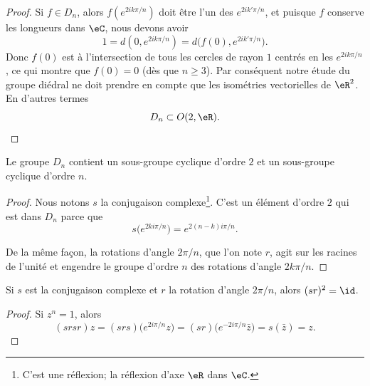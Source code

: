 \begin{proof}
	Si \( f\in D_n\), alors \( f( e^{2ik\pi/n}) \) doit être l'un des \(  e^{2ik'\pi/n}\), et puisque \( f\) conserve les longueurs dans \( \eC\), nous devons avoir
	\begin{equation}
		1=d(0, e^{2ik\pi/n})=d\big( f(0), e^{2ik'\pi/n} \big).
	\end{equation}
	Donc \( f(0)\) est à l'intersection de tous les cercles de rayon \( 1\) centrés en les \(  e^{2ik\pi/n}\), ce qui montre que \( f(0)=0\) (dès que \( n\geq 3\)). Par conséquent notre étude du groupe diédral ne doit prendre en compte que les isométries vectorielles de \( \eR^2\). En d'autres termes
	\begin{equation}
		D_n\subset O(2,\eR).
	\end{equation}
\end{proof}

\begin{proposition}      \label{PROPooELOIooVJtuZN}
	Le groupe \( D_n\) contient un sous-groupe cyclique d'ordre \( 2\) et un sous-groupe cyclique d'ordre \( n\).
\end{proposition}

\begin{proof}
	Nous notons \( s\) la conjugaison complexe\footnote{C'est une réflexion; la réflexion d'axe \( \eR\) dans \( \eC\).}. C'est un élément d'ordre \( 2\) qui est dans \( D_n\) parce que
	\begin{equation}    \label{EqSUshknP}
		s\big(  e^{2ki\pi/n} \big)= e^{2(n-k)i\pi/n}.
	\end{equation}

	De la même façon, la rotations d'angle \(2\pi/n\), que l'on note \( r\), agit sur les racines de l'unité et engendre le groupe d'ordre \( n\) des rotations d'angle \(2 k\pi/n\).
\end{proof}

\begin{proposition}
	Si \( s\) est la conjugaison complexe et \( r\) la rotation d'angle \( 2\pi/n\), alors \( (sr)^2=\id\).
\end{proposition}

\begin{proof}
	Si \( z^n=1\), alors
	\begin{equation}
		(srsr)z=(srs)\big(  e^{2 i\pi/n}z \big)=(sr)\big(  e^{-2i\pi /n}\bar z \big)=s(\bar z)=z.
	\end{equation}
\end{proof}

